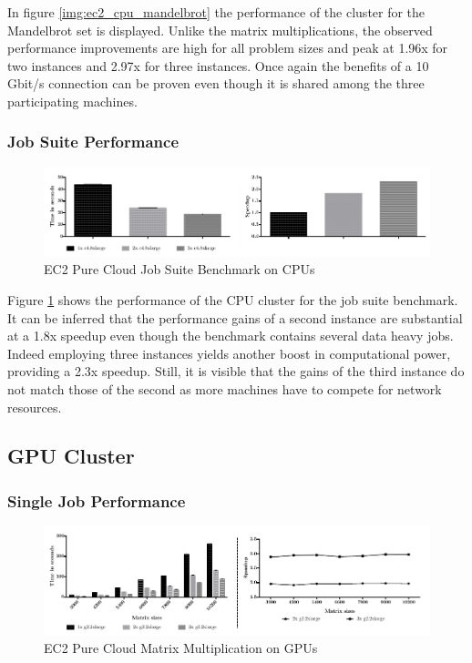 In figure \ref{img:ec2_cpu_mandelbrot} the performance of the cluster for the Mandelbrot set is displayed. Unlike the matrix multiplications, the observed performance improvements are high for all problem sizes and peak at 1.96x for two instances and 2.97x for three instances. Once again the benefits of a 10 Gbit/s connection can be proven even though it is shared among the three participating machines.
\subsubsection*{Job Suite Performance}

\begin{figure}[!htb]
	\includegraphics[width=1.0\textwidth]{images/ec2_cpu_full_benchmark.pdf}
	\centering
	\caption{EC2 Pure Cloud Job Suite Benchmark on CPUs}
	\label{img:ec2_cpu_full_benchmark}
\end{figure}

Figure \ref{img:ec2_cpu_full_benchmark} shows the performance of the CPU cluster for the job suite benchmark. It can be inferred that the performance gains of a second instance are substantial at a 1.8x speedup even though the benchmark contains several data heavy jobs. Indeed employing three instances yields another boost in computational power, providing a 2.3x speedup. Still, it is visible that the gains of the third instance do not match those of the second as more machines have to compete for network resources.

\subsection{GPU Cluster}
\subsubsection*{Single Job Performance}

\begin{figure}[!htb]
	\includegraphics[width=1.0\textwidth]{images/ec2_gpu_matrix_multiplication.pdf}
	\centering
	\caption{EC2 Pure Cloud Matrix Multiplication on GPUs}
	\label{img:ec2_gpu_matrix_multiplication}
\end{figure}


